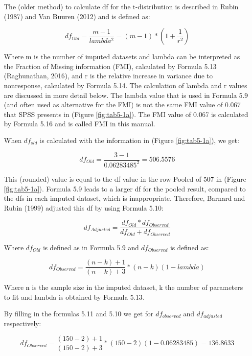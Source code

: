 \documentclass[]{book}
\theoremstyle{definition}
\theoremstyle{definition}
\theoremstyle{definition}
\theoremstyle{remark}
\begin{document}
The (older method) to calculate df for the t-distribution is described
in Rubin (1987) and Van Buuren (2012) and is defined as:

\begin{equation}
df_{Old} = \frac{m-1}{lambda^2} = (m-1) * (1 + \frac{1}{r^2})
  \label{eq:df-old}
\end{equation}

Where m is the number of imputed datasets and lambda can be interpreted
as the Fraction of Missing information (FMI), calculated by Formula 5.13
(Raghunathan, 2016), and r is the relative increase in variance due to
nonresponse, calculated by Formula 5.14. The calculation of lambda and r
values are discussed in more detail below. The lambda value that is used
in Formula 5.9 (and often used as alternative for the FMI) is not the
same FMI value of 0.067 that SPSS presents in (Figure
\ref{fig:tab5-1a}). The FMI value of 0.067 is calculated by Formula 5.16
and is called FMI in this manual.

When \(df_{old}\) is calculated with the information in (Figure
\ref{fig:tab5-1a}), we get:

\[df_{Old} = \frac{3-1}{0.06283485^2} = 506.5576\]

This (rounded) value is equal to the df value in the row Pooled of 507
in (Figure \ref{fig:tab5-1a}). Formula 5.9 leads to a larger df for the
pooled result, compared to the dfs in each imputed dataset, which is
inappropriate. Therefore, Barnard and Rubin (1999) adjusted this df by
using Formula 5.10:

\begin{equation}
df_{Adjusted} = \frac{df_{Old}*{df_{Observed}}}{df_{Old}+{df_{Observed}}}
  \label{eq:df-adj}
\end{equation}

Where \(df_{Old}\) is defined as in Formula 5.9 and \(df_{Observed}\) is
defined as:

\begin{equation}
df_{Observed} = \frac{(n-k)+1}{(n-k)+3}*(n-k)(1-lambda)
  \label{eq:df-obs}
\end{equation}

Where n is the sample size in the imputed dataset, k the number of
parameters to fit and lambda is obtained by Formula 5.13.

By filling in the formulas 5.11 and 5.10 we get for \(df_{observed}\)
and \(df_{adjusted}\) respectively:

\[df_{Observed} = \frac{(150-2)+1}{(150-2)+3}*(150-2)(1- 0.06283485)=136.8633\]
\end{document}
